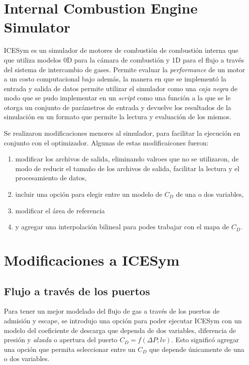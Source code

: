 \section{Internal Combustion Engine Simulator}
%
ICESym es un simulador de motores de combustión de combustión interna que que
utiliza modelos 0D para la cámara de combustión y 1D para el flujo a través del
sistema de intercambio de gases.
%
Permite evaluar la \emph{performance} de un motor a un costo computacional bajo
además, la manera en que se implementó la entrada y salida de datos permite
utilizar el simulador como una \emph{caja negra} de modo que se pudo
implementar en un \emph{script} como una función a la que se le otorga un
conjunto de parámetros de entrada y devuelve los resultados de la simulación en
un formato que permite la lectura y evaluación de los mismos.
%

Se realizaron modificaciones menores al simulador, para facilitar la ejecución
en conjunto con el optimizador.
%
Algunas de estas modificaicones fueron:
\begin{enumerate}
    \item modificar los archivos de salida, eliminando valroes que no se
        utilizaron, de modo de reducir el tamaño de los archivos de salida,
        facilitar la lectura y el procesamiento de datos, 
    \item incluir una opción para elegir entre un modelo de $C_D$ de una o dos
        variables,
    \item modificar el área de referencia
    \item y  agregar una interpolación bilineal para podes trabajar con el mapa
        de $C_D$. 
\end{enumerate}

\section{Modificaciones a ICESym}
\subsection{Flujo a través de los puertos}
%
Para tener un mejor modelado del flujo de gas a través de los puertos de
admisión y escape, se introdujo una opción para poder ejecutar ICESym con un
modelo del coeficiente de descarga que dependa de dos variables, diferencia de
presión y \emph{alzada} o apertura del puerto $C_D = f(\Delta P; lv)$.
%
Esto significó agregar una opción que permita seleccionar entre un $C_D$ que
depende únicamente de una o dos variables.


